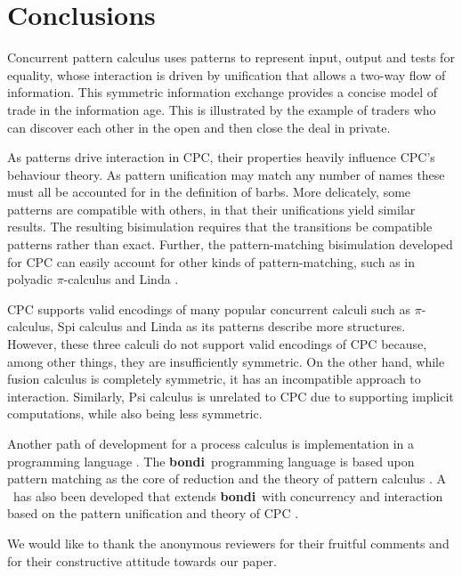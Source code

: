 \documentclass{LMCS}
\def\bondi{{\bf bondi}}
\begin{document}
\section{Conclusions} \label{sec:conclusions}

Concurrent pattern calculus uses patterns to represent input,
output and tests for equality, whose interaction is driven by
unification that allows a two-way flow of information.  This symmetric
information exchange provides a concise model of trade in the
information age.  This is illustrated by the example of traders who
can discover each other in the open and then close the deal
in private.

As patterns drive interaction in CPC, 
their properties heavily influence CPC's behaviour theory. As pattern
unification may match any number of names these must all be accounted
for in the definition of barbs. More delicately, some patterns are
compatible with others, in that their unifications yield similar results.
The resulting  bisimulation requires that the transitions be compatible
patterns rather than exact.
Further, the pattern-matching bisimulation developed for CPC can easily account
for other kinds of pattern-matching, such as in polyadic $\pi$-calculus and
Linda \cite{GivenWilsonGorla13}.

CPC supports valid encodings of many popular concurrent calculi such
as $\pi$-calculus, Spi calculus and Linda as its patterns describe
more structures. However, these three calculi do not support valid
encodings of CPC because, among other things, they are insufficiently
symmetric. On the other hand, while fusion calculus is completely
symmetric, it has an incompatible approach to interaction.
Similarly, Psi calculus is unrelated to CPC due to supporting implicit
computations, while also being less symmetric.


Another path of development for a process calculus is implementation in a
programming language \cite{Pierce97pict:a,Klava,cpplinda,20110201:jocaml}.
The \bondi\ programming language is based upon pattern matching as the core
of reduction and the theory of pattern calculus \cite{pcb,bondi}. A
\cbondi\ has also been developed that extends \bondi\ with concurrency
and interaction based on the pattern unification and theory of CPC
\cite{GivenWilsonPHD,cbondi}.

\bigskip
{} We would like to thank the anonymous reviewers for their
fruitful comments and for their constructive attitude towards our paper.
\end{document}
